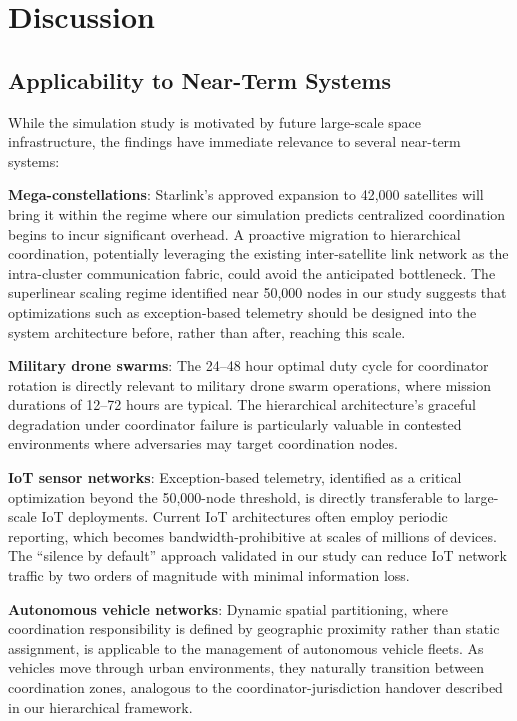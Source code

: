 \documentclass[journal]{IEEEtran}
\begin{document}
\section{Discussion}

\subsection{Applicability to Near-Term Systems}

While the simulation study is motivated by future large-scale space infrastructure, the findings have immediate relevance to several near-term systems:

\textbf{Mega-constellations}: Starlink's approved expansion to 42{,}000 satellites will bring it within the regime where our simulation predicts centralized coordination begins to incur significant overhead. A proactive migration to hierarchical coordination, potentially leveraging the existing inter-satellite link network as the intra-cluster communication fabric, could avoid the anticipated bottleneck. The superlinear scaling regime identified near 50{,}000 nodes in our study suggests that optimizations such as exception-based telemetry should be designed into the system architecture before, rather than after, reaching this scale.

\textbf{Military drone swarms}: The 24--48 hour optimal duty cycle for coordinator rotation is directly relevant to military drone swarm operations, where mission durations of 12--72 hours are typical. The hierarchical architecture's graceful degradation under coordinator failure is particularly valuable in contested environments where adversaries may target coordination nodes.

\textbf{IoT sensor networks}: Exception-based telemetry, identified as a critical optimization beyond the 50{,}000-node threshold, is directly transferable to large-scale IoT deployments. Current IoT architectures often employ periodic reporting, which becomes bandwidth-prohibitive at scales of millions of devices. The ``silence by default'' approach validated in our study can reduce IoT network traffic by two orders of magnitude with minimal information loss.

\textbf{Autonomous vehicle networks}: Dynamic spatial partitioning, where coordination responsibility is defined by geographic proximity rather than static assignment, is applicable to the management of autonomous vehicle fleets. As vehicles move through urban environments, they naturally transition between coordination zones, analogous to the coordinator-jurisdiction handover described in our hierarchical framework.
\end{document}
